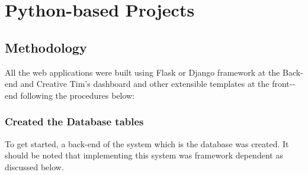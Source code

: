 \section{Python-based Projects}
\subsection{Methodology}
All the web applications were built using Flask or Django framework at the Back-end and Creative Tim’s dashboard and other extensible templates at the front-­end following the procedures below:
\subsubsection{Created the Database tables}
To get started, a back-end of the system which is the database was created. It should be noted that implementing this system was framework dependent as discussed below.
